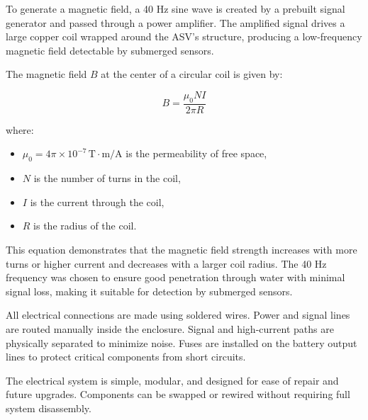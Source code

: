 To generate a magnetic field, a 40 Hz sine wave is created by a prebuilt signal generator and passed through a power amplifier. The amplified signal drives a large copper coil wrapped around the ASV’s structure, producing a low-frequency magnetic field detectable by submerged sensors.

The magnetic field \( B \) at the center of a circular coil is given by:

\begin{equation}
B = \frac{\mu_0 N I}{2\pi R}
\label{eq:bfield}
\end{equation}

where:
\begin{itemize}
    \item \( \mu_0 = 4\pi \times 10^{-7} \, \text{T}\cdot\text{m/A} \) is the permeability of free space,
    \item \( N \) is the number of turns in the coil,
    \item \( I \) is the current through the coil,
    \item \( R \) is the radius of the coil.
\end{itemize}

This equation demonstrates that the magnetic field strength increases with more turns or higher current and decreases with a larger coil radius. The 40 Hz frequency was chosen to ensure good penetration through water with minimal signal loss, making it suitable for detection by submerged sensors.

All electrical connections are made using soldered wires. Power and signal lines are routed manually inside the enclosure. Signal and high-current paths are physically separated to minimize noise. Fuses are installed on the battery output lines to protect critical components from short circuits.

The electrical system is simple, modular, and designed for ease of repair and future upgrades. Components can be swapped or rewired without requiring full system disassembly.
